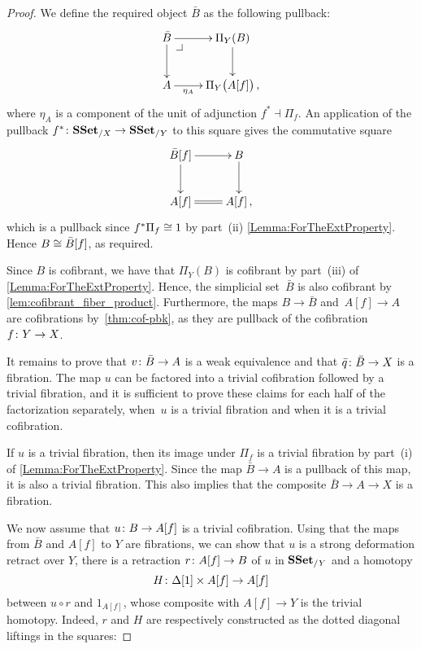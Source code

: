 \documentclass[reqno,10pt,a4paper,oneside,draft]{amsart}
\begin{document}
\begin{proof} We define the required object $\bar{B}$ as the following pullback:
\[\xymatrix{
\bar{B} \ar[d] \ar[r] \drpullback & \Pi_Y(B) \ar[d] \\
A \ar[r]_-{\eta_{A}} & \Pi_Y \big( A[f]  \big) \, ,
}\]
where $\eta_{A}$ is  a component of the unit of adjunction  $f^* \dashv \Pi_f$. An application of the pullback $f^* \colon \mathbf{SSet}_{/X} \to \mathbf{SSet}_{/Y}$ to this square gives the commutative square
\[\xymatrix{
\bar{B}[f] \ar[d] \ar[r]  & B \ar[d] \\
A[f] \ar@{=}[r] &A[f] \, ,
}\]
which is a pullback since $f^* \Pi_f \cong 1$ by part~(ii) \cref{Lemma:ForTheExtProperty}. Hence 
$B \cong \bar{B}[f]$, as required.


Since $B$ is cofibrant, we have that $\Pi_Y(B)$ is cofibrant by part~(iii) of  \cref{Lemma:ForTheExtProperty}. Hence, the simplicial set~$\bar{B}$  is also cofibrant by \cref{lem:cofibrant_fiber_product}. Furthermore, the maps $B \rightarrow \bar{B}$ and~$A[f] \rightarrow A$ are cofibrations by~\cref{thm:cof-pbk}, as they are pullback of the cofibration~$f \colon Y \rightarrow X$.





It remains to prove that $v \colon \bar{B} \rightarrow A$ is a weak equivalence and that $\bar{q} \colon \bar{B} \rightarrow X$ is a fibration. The map $u$ can be factored into a trivial cofibration followed by a trivial fibration, and it is sufficient to prove these claims for each half of the factorization separately, \ie when~$u$ is a trivial fibration and when it is a trivial cofibration.

If $u$ is a trivial fibration, then its image under $\Pi_f$ is a trivial fibration by 
part~(i) of \cref{Lemma:ForTheExtProperty}. Since the map $\bar{B} \rightarrow A$ is a pullback of this map,
it is also a trivial fibration. This also implies that the composite $\bar{B} \rightarrow A \rightarrow X$ is a fibration.


We now assume that $u \colon B \rightarrow A[f]$ is a trivial cofibration. Using that the maps from $\bar{B}$ and $A[f]$ to $Y$ are fibrations, we can show that $u$ is a strong deformation retract over $Y$, \ie there is a retraction $r \colon A[f] \rightarrow B$ of $u$ in $\mathbf{SSet}_{/Y}$ and a homotopy 
\[
H \colon \Delta[1] \times A[f] \rightarrow A[f]
\] 
between 
$u \circ r$ and $1_{A[f]}$, whose composite with $A[f] \rightarrow Y$ is the trivial homotopy. Indeed, $r$ and  $H$ are respectively constructed as the dotted diagonal liftings in the squares:


\end{proof}
\end{document}
